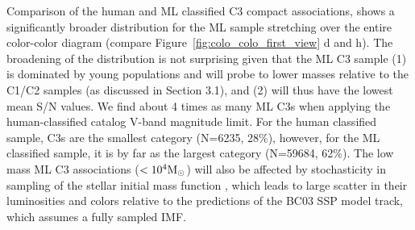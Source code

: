 \documentclass[linenumbers]{aastex63}
\begin{document}
Comparison of the human and ML classified C3 compact associations, shows a significantly broader distribution for the ML sample stretching over the entire color-color diagram (compare Figure~\ref{fig:colo_colo_first_view} d and h).    The broadening of the distribution is not surprising given that the ML C3 sample (1) is dominated by young populations and will probe to lower masses relative to the C1/C2 samples (as discussed in Section 3.1), and (2) will thus have the lowest mean S/N values.   We find about 4 times as many ML C3s when applying the human-classified catalog V-band magnitude limit. For the human classified sample, C3s are the smallest category (N=6235, 28\%), however, for the ML classified sample, it is by far as the largest category (N=59684, 62\%). %
The low mass ML C3 associations (${\rm <10^4 M_{\odot} }$) will also be affected by stochasticity in sampling of the stellar initial mass function \citep[e.g.][]{fouesneau_accounting_2010,popescu_age_2012,de_meulenaer_deriving_2013,krumholz_star_2015, OD2022}, which leads to large scatter in their luminosities and colors relative to the predictions of the BC03 SSP model track, which assumes a fully sampled IMF.
\end{document}
